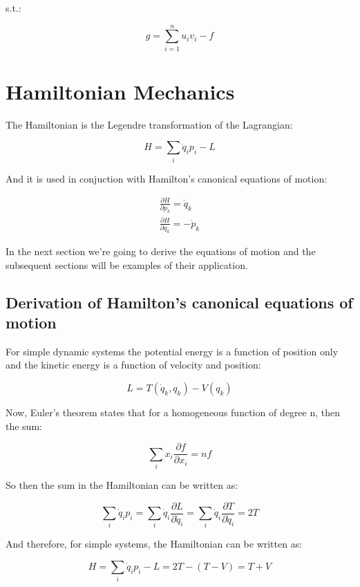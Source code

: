 \documentclass{article}
\begin{document}
s.t.:

$$g = \sum_{i=1}^n u_i v_i - f$$

%
%
\newpage
\section{Hamiltonian Mechanics}

The Hamiltonian is the Legendre transformation of the Lagrangian:

\begin{equation}
H = \sum_i \dot{ q }_i p_i - L
\end{equation}

And it is used in conjuction with Hamilton's canonical equations of motion:

\begin{align}
\frac{ \partial H }{ \partial p_k } = \dot{ q }_k\\
\frac{ \partial H }{ \partial q_k } = -\dot{ p }_k
\end{align}

In the next section we're going to derive the equations of motion and the subsequent sections will be examples of their application.

%
%
%
\subsection{Derivation of Hamilton's canonical equations of motion}

For simple dynamic systems the potential energy is a function of position only and the kinetic energy is a function of velocity and position:

$$L = T( \dot{ q }_k, q_k ) - V( q_k )$$

Now, Euler's theorem states that for a homogeneous function of degree n, then the sum:

$$\sum_i x_i \frac{ \partial f }{ \partial x_i } = nf$$

So then the sum in the Hamiltonian can be written as:

$$\sum_i \dot{ q }_i p_i = \sum_i \dot{ q }_i \frac{ \partial L }{ \partial \dot{ q }_i } = \sum_i \dot{ q }_i \frac{ \partial T }{ \partial \dot{ q }_i } = 2T$$

And therefore, for simple systems, the Hamiltonian can be written as:

\begin{equation}
H = \sum_i \dot{ q }_i p_i - L = 2T - ( T - V ) = T + V
\end{equation}
\end{document}
